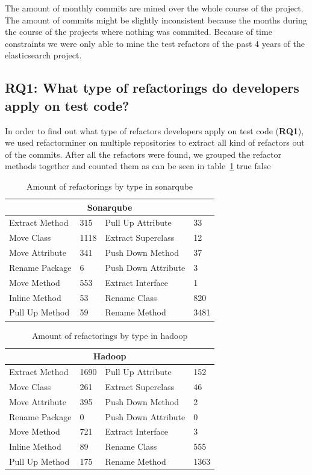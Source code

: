 The amount of monthly commits are mined over the whole course of the project. The amount of commits might be slightly inconsistent because the months during the course of the projects where nothing was commited. Because of time constraints we were only able to mine the test refactors of the past 4 years of the elasticsearch project.

\subsection{RQ1: What type of refactorings do developers apply on test code?}
\label{refactormethods}
In order to find out what type of refactors developers apply on test code (\textbf{RQ1}), we used refactorminer on multiple repositories to extract all kind of refactors out of the commits. After all the refactors were found, we grouped the refactor methods together and counted them as can be seen in table~\ref{table:9}
\ifx true false

\begin{table}[!ht]
\centering
\begin{tabular}{|l|l|l|l|}
\hline
\multicolumn{4}{|c|}{Sonarqube} \\ \hline
Extract Method & 315 & Pull Up Attribute & 33 \\ \hline
Move Class & 1118 & Extract Superclass & 12 \\ \hline
Move Attribute & 341 & Push Down Method & 37 \\ \hline
Rename Package & 6 &  Push Down Attribute & 3 \\ \hline
Move Method & 553 & Extract Interface & 1 \\ \hline
Inline Method & 53 & Rename Class & 820 \\ \hline
Pull Up Method & 59 & Rename Method & 3481 \\ \hline
\end{tabular}
\caption{Amount of refactorings by type in sonarqube}
\label{table:9}
\end{table}

\begin{table}[!ht]
\centering
\begin{tabular}{|l|l|l|l|}
\hline
\multicolumn{4}{|c|}{Hadoop} \\ \hline
Extract Method & 1690 & Pull Up Attribute & 152 \\ \hline
Move Class & 261 & Extract Superclass & 46 \\ \hline
Move Attribute & 395 & Push Down Method & 2 \\ \hline
Rename Package & 0 &  Push Down Attribute & 0 \\ \hline
Move Method & 721 & Extract Interface & 3 \\ \hline
Inline Method & 89 & Rename Class & 555 \\ \hline
Pull Up Method & 175 & Rename Method & 1363 \\ \hline
\end{tabular}
\caption{Amount of refactorings by type in hadoop}
\label{table:10}
\end{table}

